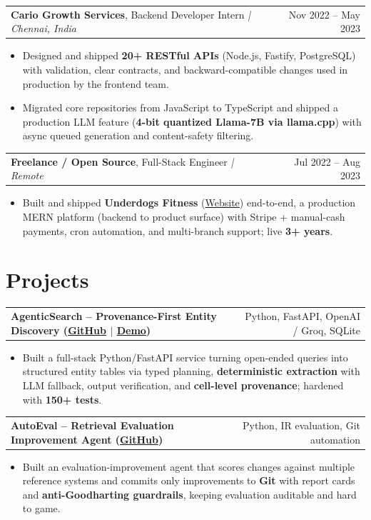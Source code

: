 \documentclass[letterpaper,11pt]{article}
\makeatletter
\newcommand{\expItem}[4]{%
  \vspace{3pt}
  \begin{tabular*}{\textwidth}{@{}l@{\extracolsep{\fill}}r@{}}
    \textbf{#1}, #2 \textit{| #3} & #4 \\
  \end{tabular*}\par\vspace{-2pt}
}
\newcommand{\projItem}[2]{%
  \vspace{6pt}
  \begin{tabular*}{\textwidth}{@{}l@{\extracolsep{\fill}}r@{}}
    \textbf{#1} & #2 \\
  \end{tabular*}\par\vspace{-2pt}
}
\makeatother
\begin{document}
\expItem{Cario Growth Services}{Backend Developer Intern}{Chennai, India}{Nov 2022 -- May 2023}
\begin{itemize}
  \item Designed and shipped \textbf{20+ RESTful APIs} (Node.js, Fastify, PostgreSQL) with validation, clear contracts, and backward-compatible changes used in production by the frontend team.
  \item Migrated core repositories from JavaScript to TypeScript and shipped a production LLM feature (\textbf{4-bit quantized Llama-7B via llama.cpp}) with async queued generation and content-safety filtering.
\end{itemize}

\expItem{Freelance / Open Source}{Full-Stack Engineer}{Remote}{Jul 2022 -- Aug 2023}
\begin{itemize}
  \item Built and shipped \textbf{Underdogs Fitness} (\href{https://www.underdogsfitness.in/}{Website}) end-to-end, a production MERN platform (backend to product surface) with Stripe + manual-cash payments, cron automation, and multi-branch support; live \textbf{3+ years}.
\end{itemize}

\section{Projects}

\projItem{AgenticSearch -- Provenance-First Entity Discovery {\normalfont\small(\href{https://github.com/Deva-1903/ciir_agentic_search}{GitHub} $\vert$ \href{https://agentic-search-negglszkwa-uc.a.run.app}{Demo})}}{Python, FastAPI, OpenAI / Groq, SQLite}
\begin{itemize}
  \item Built a full-stack Python/FastAPI service turning open-ended queries into structured entity tables via typed planning, \textbf{deterministic extraction} with LLM fallback, output verification, and \textbf{cell-level provenance}; hardened with \textbf{150+ tests}.
\end{itemize}

\projItem{AutoEval -- Retrieval Evaluation Improvement Agent {\normalfont\small(\href{https://github.com/Deva-1903/AutoEval}{GitHub})}}{Python, IR evaluation, Git automation}
\begin{itemize}
  \item Built an evaluation-improvement agent that scores changes against multiple reference systems and commits only improvements to \textbf{Git} with report cards and \textbf{anti-Goodharting guardrails}, keeping evaluation auditable and hard to game.
\end{itemize}
\end{document}
